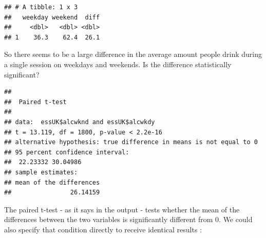 \documentclass[
]{book}
\newenvironment{Shaded}{\begin{snugshade}}{\end{snugshade}}
\newcommand{\DataTypeTok}[1]{\textcolor[rgb]{0.13,0.29,0.53}{#1}}
\newcommand{\DecValTok}[1]{\textcolor[rgb]{0.00,0.00,0.81}{#1}}
\newcommand{\KeywordTok}[1]{\textcolor[rgb]{0.13,0.29,0.53}{\textbf{#1}}}
\newcommand{\NormalTok}[1]{#1}
\newcommand{\OperatorTok}[1]{\textcolor[rgb]{0.81,0.36,0.00}{\textbf{#1}}}
\newcommand{\OtherTok}[1]{\textcolor[rgb]{0.56,0.35,0.01}{#1}}
\newcommand{\StringTok}[1]{\textcolor[rgb]{0.31,0.60,0.02}{#1}}
\begin{document}
\begin{Shaded}
\end{Shaded}

\begin{verbatim}
## # A tibble: 1 x 3
##   weekday weekend  diff
##     <dbl>   <dbl> <dbl>
## 1    36.3    62.4  26.1
\end{verbatim}

So there seems to be a large difference in the average amount people drink during a single session on weekdays and weekends. Is the difference statistically significant?

\begin{Shaded}
\end{Shaded}

\begin{verbatim}
## 
## 	Paired t-test
## 
## data:  essUK$alcwknd and essUK$alcwkdy
## t = 13.119, df = 1800, p-value < 2.2e-16
## alternative hypothesis: true difference in means is not equal to 0
## 95 percent confidence interval:
##  22.23332 30.04986
## sample estimates:
## mean of the differences 
##                26.14159
\end{verbatim}

The paired t-test - as it says in the output - tests whether the mean of the differences between the two variables is significantly different from 0. We could also specify that condition directly to receive identical results :

\begin{Shaded}
\end{Shaded}
\end{document}
